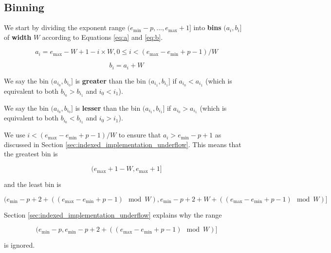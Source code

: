 \documentclass[12pt]{article}
\providecommand{\min}{\ensuremath{\text{min}}}
\providecommand{\max}{\ensuremath{\text{max}}}
\theoremstyle{plain}
\numberwithin{equation}{section}
\begin{document}
  \subsection{Binning}
    \label{sec:indexed_binning}
    We start by dividing the exponent range $(e_{\min} - p, ..., e_{\max} + 1]$ into \textbf{bins} $(a_i, b_i]$ of \textbf{width} $W$ according to Equations \ref{eq:a} and \ref{eq:b}.

    \begin{equation}
      a_i = e_{\max} - W + 1 - i\times W, 0 \leq i < (e_{\max} - e_{\min} + p - 1)/W
      \label{eq:a}
    \end{equation}

    \begin{equation}
      b_i = a_i + W
      \label{eq:b}
    \end{equation}

    We say the bin $(a_{i_0}, b_{i_0}]$ is \textbf{greater} than the bin $(a_{i_1}, b_{i_1}]$ if $a_{i_0} < a_{i_1}$ (which is equivalent to both $b_{i_0} > b_{i_1}$ and $i_0 < i_1$).

    We say the bin $(a_{i_0}, b_{i_0}]$ is \textbf{lesser} than the bin $(a_{i_1}, b_{i_1}]$ if $a_{i_0} > a_{i_1}$ (which is equivalent to both $b_{i_0} < b_{i_1}$ and $i_0 > i_1$).

    We use $i < (e_{\max} - e_{\min} + p - 1)/W$ to ensure that $a_i > e_{\min} - p + 1$ as discussed in Section \ref{sec:indexed_implementation_underflow}. This means that the greatest bin is

    \begin{equation}
      (e_{\max} + 1 - W, e_{\max} + 1]
      \label{eq:binmax}
    \end{equation}

    and the least bin is

    \begin{equation}
      (e_{\min} - p + 2 + ((e_{\max} - e_{\min} + p - 1)\mod W),
      e_{\min} - p + 2 + W + ((e_{\max} - e_{\min} + p - 1)\mod W)]
      \label{eq:binmin}
    \end{equation}

    Section \ref{sec:indexed_implementation_underflow} explains why the range

    \begin{equation*}
    (e_{\min} - p, e_{\min} - p + 2 + ((e_{\max} - e_{\min} + p - 1) \mod W)]
    \end{equation*}

    is ignored.
\end{document}
